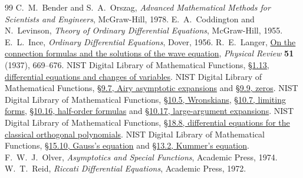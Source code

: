 \documentclass[11pt,a4paper]{amsart}
\theoremstyle{definition}
\theoremstyle{remark}
\begin{document}
\begin{thebibliography}{99}
 C.~M.~Bender and S.~A.~Orszag, \emph{Advanced Mathematical Methods for Scientists and Engineers}, McGraw-Hill, 1978.
 E.~A.~Coddington and N.~Levinson, \emph{Theory of Ordinary Differential Equations}, McGraw-Hill, 1955.
 E.~L.~Ince, \emph{Ordinary Differential Equations}, Dover, 1956.
 R.~E.~Langer, \href{https://doi.org/10.1103/PhysRev.51.669}{On the connection formulas and the solutions of the wave equation}, \emph{Physical Review} \textbf{51} (1937), 669--676.
 NIST Digital Library of Mathematical Functions, \href{https://dlmf.nist.gov/1.13}{\S1.13, differential equations and changes of variables}.
 NIST Digital Library of Mathematical Functions, \href{https://dlmf.nist.gov/9.7}{\S9.7, Airy asymptotic expansions} and \href{https://dlmf.nist.gov/9.9}{\S9.9, zeros}.
 NIST Digital Library of Mathematical Functions, \href{https://dlmf.nist.gov/10.5}{\S10.5, Wronskians}, \href{https://dlmf.nist.gov/10.7}{\S10.7, limiting forms}, \href{https://dlmf.nist.gov/10.16}{\S10.16, half-order formulas} and \href{https://dlmf.nist.gov/10.17}{\S10.17, large-argument expansions}.
 NIST Digital Library of Mathematical Functions, \href{https://dlmf.nist.gov/18.8}{\S18.8, differential equations for the classical orthogonal polynomials}.
 NIST Digital Library of Mathematical Functions, \href{https://dlmf.nist.gov/15.10}{\S15.10, Gauss's equation} and \href{https://dlmf.nist.gov/13.2}{\S13.2, Kummer's equation}.
 F.~W.~J.~Olver, \emph{Asymptotics and Special Functions}, Academic Press, 1974.
 W.~T.~Reid, \emph{Riccati Differential Equations}, Academic Press, 1972.
\end{thebibliography}
\end{document}
